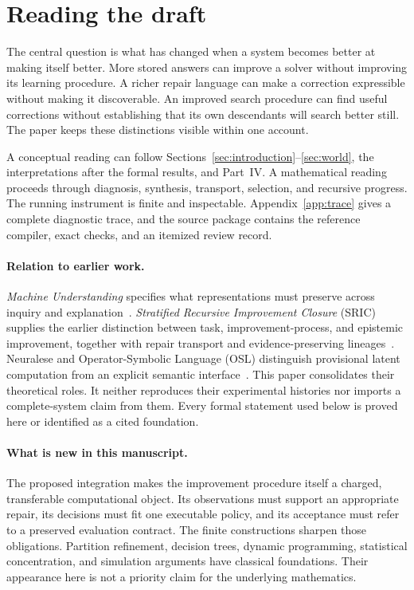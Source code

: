 \documentclass[11pt,letterpaper]{article}
\theoremstyle{plain}
\theoremstyle{definition}
\begin{document}
\section*{Reading the draft}
The central question is what has changed when a system becomes better at making itself better. More stored answers can improve a solver without improving its learning procedure. A richer repair language can make a correction expressible without making it discoverable. An improved search procedure can find useful corrections without establishing that its own descendants will search better still. The paper keeps these distinctions visible within one account.

A conceptual reading can follow Sections~\ref{sec:introduction}--\ref{sec:world}, the interpretations after the formal results, and Part~IV. A mathematical reading proceeds through diagnosis, synthesis, transport, selection, and recursive progress. The running instrument is finite and inspectable. Appendix~\ref{app:trace} gives a complete diagnostic trace, and the source package contains the reference compiler, exact checks, and an itemized review record.

\paragraph{Relation to earlier work.}
\emph{Machine Understanding} specifies what representations must preserve across inquiry and explanation~\cite{understanding}. \emph{Stratified Recursive Improvement Closure} (SRIC) supplies the earlier distinction between task, improvement-process, and epistemic improvement, together with repair transport and evidence-preserving lineages~\cite{sric}. Neuralese and Operator-Symbolic Language (OSL) distinguish provisional latent computation from an explicit semantic interface~\cite{neuralese,osl}. This paper consolidates their theoretical roles. It neither reproduces their experimental histories nor imports a complete-system claim from them. Every formal statement used below is proved here or identified as a cited foundation.

\paragraph{What is new in this manuscript.}
The proposed integration makes the improvement procedure itself a charged, transferable computational object. Its observations must support an appropriate repair, its decisions must fit one executable policy, and its acceptance must refer to a preserved evaluation contract. The finite constructions sharpen those obligations. Partition refinement, decision trees, dynamic programming, statistical concentration, and simulation arguments have classical foundations. Their appearance here is not a priority claim for the underlying mathematics.
\end{document}
